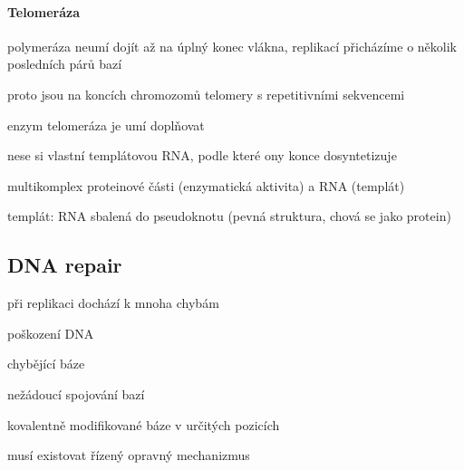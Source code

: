\documentclass[DIV=8]{scrreprt}
\begin{document}
\paragraph{Telomeráza}
\begin{myItemize}[nosep]
    \item polymeráza neumí dojít až na úplný konec vlákna, replikací přicházíme o několik posledních párů bazí
    \item proto jsou na koncích chromozomů telomery s repetitivními sekvencemi
    \item enzym telomeráza je umí doplňovat
\begin{myItemize}[nosep]
    \item nese si vlastní templátovou RNA, podle které ony konce dosyntetizuje
\end{myItemize}

    \item multikomplex proteinové části (enzymatická aktivita) a RNA (templát)
\begin{myItemize}[nosep]
    \item templát: RNA sbalená do pseudoknotu (pevná struktura, chová se jako protein)
\end{myItemize}

\end{myItemize}



\subsection{DNA repair} \label{DNA repair}


\begin{myItemize}[nosep]
    \item při replikaci dochází k mnoha chybám
    \item poškození DNA
\begin{myItemize}[nosep]
    \item chybějící báze
    \item nežádoucí spojování bazí
    \item kovalentně modifikované báze v určitých pozicích
\end{myItemize}

    \item musí existovat řízený opravný mechanizmus
\end{myItemize}
\end{document}
